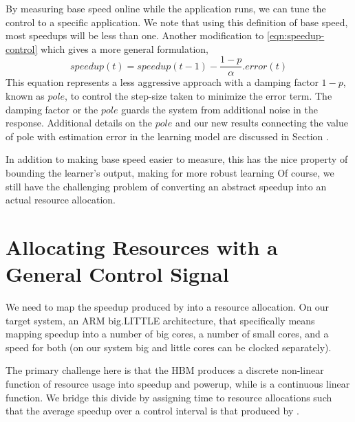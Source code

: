 By measuring
base speed online while the application runs, we can tune the control
to a specific application.  We note that using this definition of base
speed, most speedups will be less than one.  Another modification to \eqref{eqn:speedup-control} which gives a more general formulation,
\begin{equation}
speedup(t) = speedup(t-1) - \frac{1 - p}{\alpha}.error(t)
\end{equation}
This equation represents a less aggressive approach with a damping factor $1-p$, known as $pole$, to control the step-size taken to minimize the error term. The damping factor or the $pole$ guards the system from additional noise in the response. Additional details on the $pole$ and our new results connecting the value of pole with estimation error in the learning model are discussed in Section \secref{}.

In addition to making
base speed easier to measure, this has the nice property of bounding
the learner's output, making for more robust learning 
Of course, we still have the challenging problem of converting an
abstract speedup into an actual resource allocation.


\section{Allocating Resources with a General Control Signal}
We need to map the speedup produced by  into a
resource allocation.  On our target system, an ARM big.LITTLE
architecture, that specifically means mapping speedup into a number of
big cores, a number of small cores, and a speed for both (on our
system big and little cores can be clocked separately).

The primary challenge here is that the HBM produces a discrete
non-linear function of resource usage into speedup and powerup, while
 is a continuous linear function.  We bridge
this divide by assigning time to resource allocations such that the
average speedup over a control interval is that produced by
.

